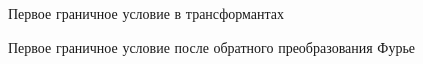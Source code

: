 \documentclass[a4paper, 12pt]{article}
\begin{document}
\begin{figure}[h!]
\noindent{}
\caption{Первое граничное условие в трансформантах}
\label{figCurves}
\end{figure}

\begin{figure}[h!]
\noindent{}
\caption{Первое граничное условие после обратного преобразования Фурье}
\label{figCurves}
\end{figure}
\end{document}

